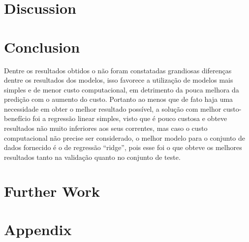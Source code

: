 \section{Discussion}


\section{Conclusion}
Dentre os resultados obtidos o não foram constatadas grandiosas diferenças dentre os resultados dos modelos, isso favorece a utilização de modelos mais simples e de menor custo computacional, em detrimento da pouca melhora da predição com o aumento do custo. Portanto ao menos que de fato haja uma necessidade em obter o melhor resultado possível, a solução com melhor custo-benefício foi a regressão linear simples, visto que é pouco custosa e obteve resultados não muito inferiores aos seus correntes, mas caso o custo computacional não precise ser considerado, o melhor modelo para o conjunto de dados fornecido é o de regressão ``ridge'', pois esse foi o que obteve os melhores resultados tanto na validação quanto no conjunto de teste.


\section{Further Work}


\section*{Appendix}

